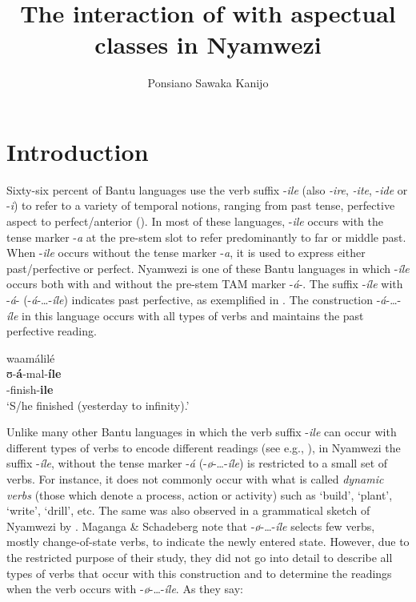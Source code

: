 \documentclass[output=paper,newtxmath,modfonts,nonflat,draftmode]{langsci/langscibook}
\author{Ponsiano Sawaka Kanijo\affiliation{University of Gothenburg}}
\title{The interaction of  with aspectual classes in Nyamwezi}
\begin{document}
\maketitle


\section{Introduction}

Sixty-six percent of Bantu languages use the verb suffix -\textit{ile} (also \textit{-ire}, \textit{-ite}, -\textit{ide} or -\textit{i}) to refer to a variety of temporal notions, ranging from past tense, perfective aspect to perfect/anterior (\citealt{Nurse2008,Botne2010}). In most of these languages, -\textit{ile} occurs with the tense marker -\textit{a} at the pre-stem slot to refer predominantly to far or middle past. When -\textit{ile} occurs without the tense marker -\textit{a}, it is used to express either past/perfective or perfect. Nyamwezi is one of these Bantu languages in which -\textit{íle} occurs both with and without the pre-stem TAM marker -\textit{á}-. The suffix -\textit{íle} with -\textit{á}- (-\textit{á}-…-\textit{íle}) indicates past perfective, as exemplified in . The construction -\textit{á}-…-\textit{íle} in this language occurs with all types of verbs and maintains the past perfective reading. 

\ea \label{ex:kanijo:1}
\glll waamálilé\\
ʊ-\textbf{á}-mal-\textbf{íle}\\
-finish-\textbf{ile}\\
\glt ‘S/he finished (yesterday to infinity).’\\
\z

Unlike many other Bantu languages in which the verb suffix -\textit{ile} can occur with different types of verbs to encode different readings (see e.g., \citealt{Brisard2009}), in Nyamwezi the suffix -\textit{íle}, without the tense marker -\textit{á} (-\textit{ø}-…-\textit{íle}) is restricted to a small set of verbs. For instance, it does not commonly occur with what is called \textit{dynamic} \textit{verbs} (those which denote a process, action or activity) such as ‘build’, ‘plant’, ‘write’, ‘drill’, etc. The same was also observed in a grammatical sketch of Nyamwezi by \citet{Maganga1992}. Maganga \& Schadeberg note that -\textit{ø}-…-\textit{íle} selects few verbs, mostly change-of-state verbs, to indicate the newly entered state. However, due to the restricted purpose of their study, they did not go into detail to describe all types of verbs that occur with this construction and to determine the readings when the verb occurs with -\textit{ø}-…-\textit{íle}. As they say:
\end{document}
